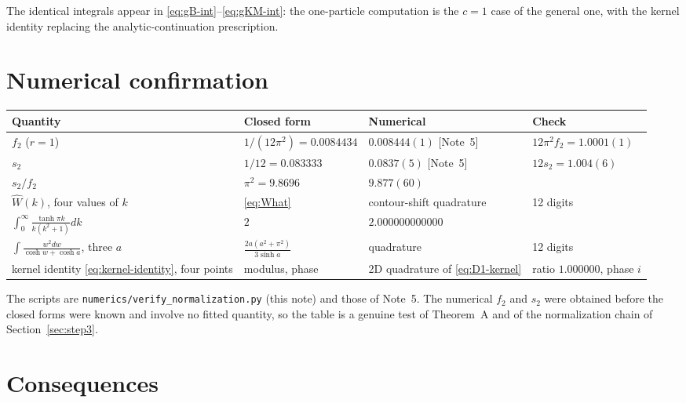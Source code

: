 \documentclass[11pt]{article}
\theoremstyle{accent}
\theoremstyle{definition}
\newcommand{\Wh}{\widehat W}
\begin{document}
The identical integrals appear in \eqref{eq:gB-int}--\eqref{eq:gKM-int}: the one-particle computation is the \(c=1\) case of the general one, with the kernel identity replacing the analytic-continuation prescription.
\section{Numerical confirmation}\label{sec:numerics}

\begin{center}\footnotesize
\begin{tabular}{l l l l}\toprule
Quantity & Closed form & Numerical & Check \\\midrule
\(f_2\) (\(r=1\)) & \(1/(12\pi^2)=0.0084434\) & \(0.008444(1)\) [Note~5] & \(12\pi^2f_2=1.0001(1)\) \\
\(s_2\) & \(1/12=0.083333\) & \(0.0837(5)\) [Note~5] & \(12s_2=1.004(6)\) \\
\(s_2/f_2\) & \(\pi^2=9.8696\) & \(9.877(60)\) & \\
\(\Wh(k)\), four values of \(k\) & \eqref{eq:What} & contour-shift quadrature & 12 digits \\
\(\int_0^\infty\frac{\tanh\pi k}{k(k^2+1)}dk\) & \(2\) & \(2.000000000000\) & \\
\(\int\frac{w^2dw}{\cosh w+\cosh a}\), three \(a\) & \(\frac{2a(a^2+\pi^2)}{3\sinh a}\) & quadrature & 12 digits \\
kernel identity \eqref{eq:kernel-identity}, four points & modulus, phase & 2D quadrature of \eqref{eq:D1-kernel} & ratio \(1.000000\), phase \(i\) \\
\bottomrule
\end{tabular}
\end{center}
The scripts are \texttt{numerics/verify\_normalization.py} (this note) and those of Note~5.  The numerical \(f_2\) and \(s_2\) were obtained before the closed forms were known and involve no fitted quantity, so the table is a genuine test of Theorem~A and of the normalization chain of Section~\ref{sec:step3}.

\section{Consequences}\label{sec:consequences}
\end{document}
